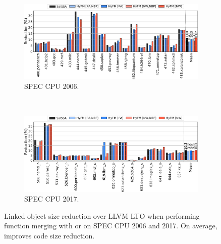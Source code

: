  \begin{figure}[h]
   \centering
 \begin{subfigure}{\textwidth}
 \center
   \includegraphics[width=\textwidth]{src/lctes21/figs/reduction-spec06.pdf}
 \caption{SPEC CPU 2006.}
 \label{fig:size-reduction-spec06}
 \end{subfigure}
 \\
 \begin{subfigure}{\textwidth}
 \center
   \includegraphics[width=\textwidth]{src/lctes21/figs/reduction-spec17.pdf}
 \caption{SPEC CPU 2017.}
 \label{fig:size-reduction-spec17}
 \end{subfigure}
 \caption{Linked object size reduction over LLVM LTO
      when performing function merging with {\ProjName} or {\SOAName} on SPEC CPU 2006 and 2017. On average, {\ProjName} improves code size reduction.}
  \label{fig:size-reduction-both}
 \end{figure}


